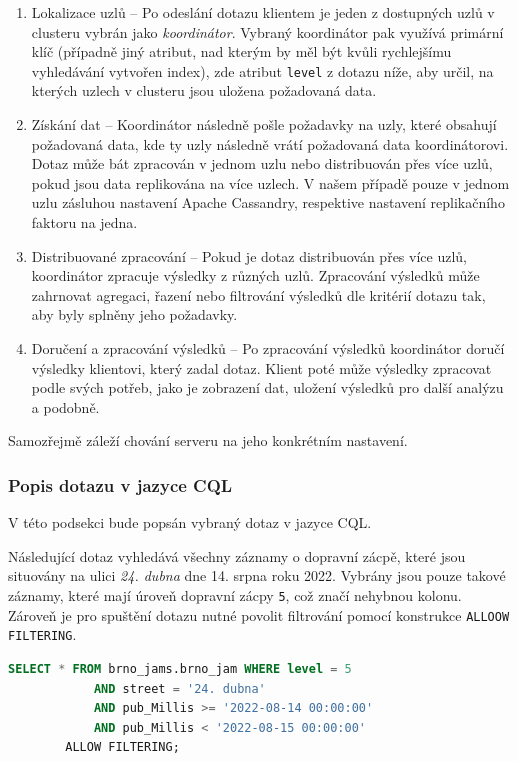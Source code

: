 \documentclass[a4paper, 11pt]{article}
\begin{document}
    \begin{enumerate}
        \item Lokalizace uzlů -- Po odeslání dotazu klientem je jeden z dostupných uzlů v clusteru vybrán jako \textit{koordinátor}. Vybraný koordinátor pak využívá primární klíč (případně jiný atribut, nad kterým by měl být kvůli rychlejšímu vyhledávání vytvořen index), zde atribut \texttt{level} z dotazu níže, aby určil, na kterých uzlech v clusteru jsou uložena požadovaná data.
        \item Získání dat -- Koordinátor následně pošle požadavky na uzly, které obsahují požadovaná data, kde ty uzly následně vrátí požadovaná data koordinátorovi. Dotaz může bát zpracován v jednom uzlu nebo distribuován přes více uzlů, pokud jsou data replikována na více uzlech. V našem případě pouze v jednom uzlu zásluhou nastavení Apache Cassandry, respektive nastavení replikačního faktoru na jedna.
        \item Distribuované zpracování -- Pokud je dotaz distribuován přes více uzlů, koordinátor zpracuje výsledky z různých uzlů. Zpracování výsledků může zahrnovat agregaci, řazení nebo filtrování výsledků dle kritérií dotazu tak, aby byly splněny jeho požadavky.
        \item Doručení a zpracování výsledků -- Po zpracování výsledků koordinátor doručí výsledky klientovi, který zadal dotaz. Klient poté může výsledky zpracovat podle svých potřeb, jako je zobrazení dat, uložení výsledků pro další analýzu a podobně.
    \end{enumerate}
    Samozřejmě záleží chování serveru na jeho konkrétním nastavení. 

    \subsubsection{Popis dotazu v jazyce CQL}
    V této podsekci bude popsán vybraný dotaz v jazyce CQL.

    Následující dotaz vyhledává všechny záznamy o dopravní zácpě, které jsou situovány na ulici \textit{24. dubna} dne 14. srpna roku 2022. Vybrány jsou pouze takové záznamy, které mají úroveň dopravní zácpy \texttt{5}, což značí nehybnou kolonu. Zároveň je pro spuštění dotazu nutné povolit filtrování pomocí konstrukce \texttt{ALLOOW FILTERING}.

    \begin{lstlisting}[style=NoSQL, language=SQL, framesep=10pt, morekeywords={ALLOW}]
        SELECT * FROM brno_jams.brno_jam WHERE level = 5 
            AND street = '24. dubna' 
            AND pub_Millis >= '2022-08-14 00:00:00' 
            AND pub_Millis < '2022-08-15 00:00:00' 
        ALLOW FILTERING;
    \end{lstlisting}
\end{document}

